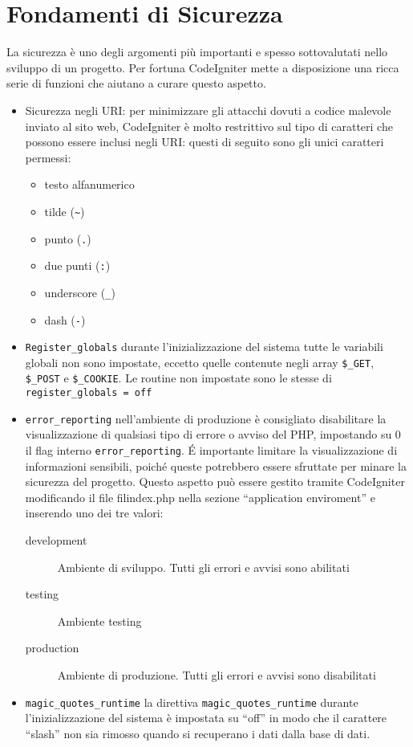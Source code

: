 \section{Fondamenti di Sicurezza}
\label{cap:sicurezza}

La sicurezza è uno degli argomenti più importanti e spesso sottovalutati nello sviluppo di un progetto. Per fortuna CodeIgniter mette a disposizione una ricca serie di funzioni che aiutano a curare questo aspetto.

\begin{itemize}
\item Sicurezza negli URI: per minimizzare gli attacchi dovuti a codice malevole inviato al sito web, CodeIgniter è molto restrittivo sul tipo di caratteri che possono essere inclusi negli URI: questi di seguito sono gli unici caratteri permessi:

\begin{itemize}
\item testo alfanumerico
\item tilde (\verb|~|)
\item punto (\verb|.|)
\item due punti (\verb|:|)
\item underscore (\verb|_|)
\item dash (\verb|-|)
\end{itemize}

\item \verb|Register_globals| durante l'inizializzazione del sistema tutte le variabili globali non sono impostate, eccetto quelle contenute negli array \verb|$_GET|, \verb|$_POST| e \verb|$_COOKIE|. Le routine non impostate sono le stesse di \verb|register_globals = off|

\item \verb|error_reporting| nell'ambiente di produzione è consigliato disabilitare la visualizzazione di qualsiasi tipo di errore o avviso del \ac{PHP}, impostando su 0 il flag interno  \verb|error_reporting|. \'E importante limitare la visualizzazione di informazioni sensibili, poiché queste potrebbero essere sfruttate per minare la sicurezza del progetto. Questo aspetto può essere gestito tramite CodeIgniter modificando il file fil{index.php} nella sezione ``application enviroment'' e inserendo uno dei tre valori:

\begin{description}
\item [development] Ambiente di sviluppo. Tutti gli errori e avvisi sono abilitati
\item [testing] Ambiente testing
\item [production] Ambiente di produzione. Tutti gli errori e avvisi sono disabilitati
\end{description}

\item \verb|magic_quotes_runtime| la direttiva \verb|magic_quotes_runtime| durante l'inizializzazione del sistema è impostata su ``off'' in modo che il carattere ``slash'' non sia rimosso quando si recuperano i dati dalla base di dati.
\end{itemize}

